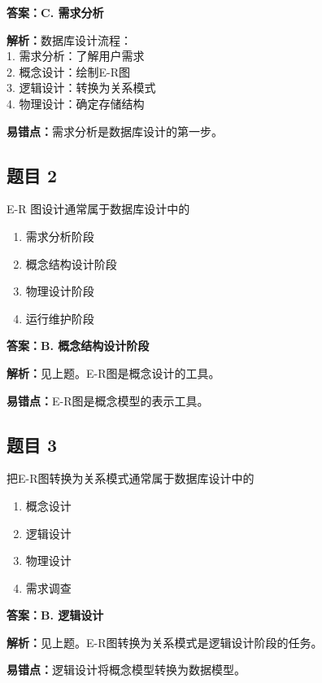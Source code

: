 \documentclass[12pt,a4paper]{ctexart}
\begin{document}
\begin{answerbox}
	\textbf{答案：C. 需求分析}

	\textbf{解析：}数据库设计流程：\\
	1. 需求分析：了解用户需求\\
	2. 概念设计：绘制E-R图\\
	3. 逻辑设计：转换为关系模式\\
	4. 物理设计：确定存储结构

	\textbf{易错点：}需求分析是数据库设计的第一步。
\end{answerbox}

\subsection*{题目 2}
E-R 图设计通常属于数据库设计中的
\begin{enumerate}[label=\Alph*.]
	\item 需求分析阶段
	\item 概念结构设计阶段
	\item 物理设计阶段
	\item 运行维护阶段
\end{enumerate}

\begin{answerbox}
	\textbf{答案：B. 概念结构设计阶段}

	\textbf{解析：}见上题。E-R图是概念设计的工具。

	\textbf{易错点：}E-R图是概念模型的表示工具。
\end{answerbox}

\subsection*{题目 3}
把E-R图转换为关系模式通常属于数据库设计中的
\begin{enumerate}[label=\Alph*.]
	\item 概念设计
	\item 逻辑设计
	\item 物理设计
	\item 需求调查
\end{enumerate}

\begin{answerbox}
	\textbf{答案：B. 逻辑设计}

	\textbf{解析：}见上题。E-R图转换为关系模式是逻辑设计阶段的任务。

	\textbf{易错点：}逻辑设计将概念模型转换为数据模型。
\end{answerbox}
\end{document}
